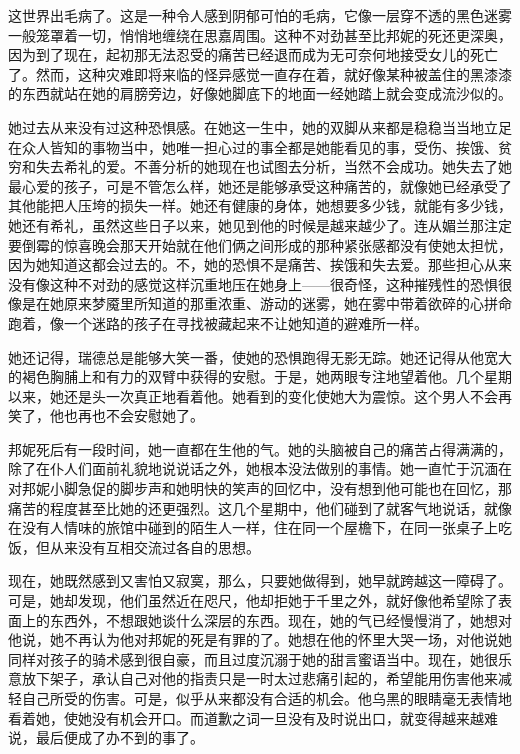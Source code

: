 \par 这世界出毛病了。这是一种令人感到阴郁可怕的毛病，它像一层穿不透的黑色迷雾一般笼罩着一切，悄悄地缠绕在思嘉周围。这种不对劲甚至比邦妮的死还更深奥，因为到了现在，起初那无法忍受的痛苦已经退而成为无可奈何地接受女儿的死亡了。然而，这种灾难即将来临的怪异感觉一直存在着，就好像某种被盖住的黑漆漆的东西就站在她的肩膀旁边，好像她脚底下的地面一经她踏上就会变成流沙似的。
\par 她过去从来没有过这种恐惧感。在她这一生中，她的双脚从来都是稳稳当当地立足在众人皆知的事物当中，她唯一担心过的事全都是她能看见的事，受伤、挨饿、贫穷和失去希礼的爱。不善分析的她现在也试图去分析，当然不会成功。她失去了她最心爱的孩子，可是不管怎么样，她还是能够承受这种痛苦的，就像她已经承受了其他能把人压垮的损失一样。她还有健康的身体，她想要多少钱，就能有多少钱，她还有希礼，虽然这些日子以来，她见到他的时候是越来越少了。连从媚兰那注定要倒霉的惊喜晚会那天开始就在他们俩之间形成的那种紧张感都没有使她太担忧，因为她知道这都会过去的。不，她的恐惧不是痛苦、挨饿和失去爱。那些担心从来没有像这种不对劲的感觉这样沉重地压在她身上——很奇怪，这种摧残性的恐惧很像是在她原来梦魇里所知道的那重浓重、游动的迷雾，她在雾中带着欲碎的心拼命跑着，像一个迷路的孩子在寻找被藏起来不让她知道的避难所一样。
\par 她还记得，瑞德总是能够大笑一番，使她的恐惧跑得无影无踪。她还记得从他宽大的褐色胸脯上和有力的双臂中获得的安慰。于是，她两眼专注地望着他。几个星期以来，她还是头一次真正地看着他。她看到的变化使她大为震惊。这个男人不会再笑了，他也再也不会安慰她了。
\par 邦妮死后有一段时间，她一直都在生他的气。她的头脑被自己的痛苦占得满满的，除了在仆人们面前礼貌地说说话之外，她根本没法做别的事情。她一直忙于沉湎在对邦妮小脚急促的脚步声和她明快的笑声的回忆中，没有想到他可能也在回忆，那痛苦的程度甚至比她的还更强烈。这几个星期中，他们碰到了就客气地说话，就像在没有人情味的旅馆中碰到的陌生人一样，住在同一个屋檐下，在同一张桌子上吃饭，但从来没有互相交流过各自的思想。
\par 现在，她既然感到又害怕又寂寞，那么，只要她做得到，她早就跨越这一障碍了。可是，她却发现，他们虽然近在咫尺，他却拒她于千里之外，就好像他希望除了表面上的东西外，不想跟她谈什么深层的东西。现在，她的气已经慢慢消了，她想对他说，她不再认为他对邦妮的死是有罪的了。她想在他的怀里大哭一场，对他说她同样对孩子的骑术感到很自豪，而且过度沉溺于她的甜言蜜语当中。现在，她很乐意放下架子，承认自己对他的指责只是一时太过悲痛引起的，希望能用伤害他来减轻自己所受的伤害。可是，似乎从来都没有合适的机会。他乌黑的眼睛毫无表情地看着她，使她没有机会开口。而道歉之词一旦没有及时说出口，就变得越来越难说，最后便成了办不到的事了。
